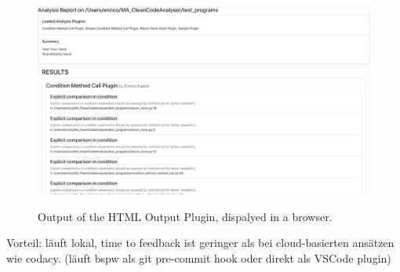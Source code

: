 \begin{figure}
    \includegraphics[width=1\textwidth]{img/CCAP/screenshot_html_output.png}
    \label{fig:screen_html_output}
    \caption{Output of the HTML Output Plugin, dispalyed in a browser.}
\end{figure}

Vorteil: läuft lokal, time to feedback ist geringer als bei cloud-basierten ansätzen wie codacy. (läuft bspw als git pre-commit hook oder direkt als VSCode plugin)